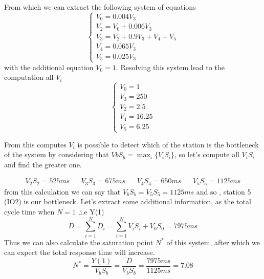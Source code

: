 \documentclass[12pt,a4paper]{article}
\begin{document}
From which we can extract the following system of equations
\begin{displaymath}
    \begin{cases}
        V_0=0.004V_3           \\
        V_2=V_0+0.006V_3       \\
        V_3=V_2+0.9V_3+V_4+V_5 \\
        V_4=0.065V_3           \\
        V_5= 0.025V_3
    \end{cases}
\end{displaymath}
with the additional equation $V_0=1$. Resolving this system lead to the computation
all $V_i$
\begin{displaymath}
    \begin{cases}
        V_0=1     \\
        V_3=250   \\
        V_2=2.5   \\
        V_4=16.25 \\
        V_5=6.25
    \end{cases}
\end{displaymath}

From this computes $V_i$ is possible to detect which of the station is the bottleneck of the system
by considering that $VbS_b= \max_i\{V_iS_i\}$, so let's compute all $V_iS_i$ and find
the greater one.

\begin{displaymath}
    \begin{aligned}
        V_2S_2= 525ms &  & V_3S_3=675ms &  & V_4S_4=650ms &  & V_5S_5= 1125ms
    \end{aligned}
\end{displaymath}
from this calculation we can say that $V_bS_b=V_5S_5=1125ms$ and so , station 5 (IO2) is
our bottleneck. Let's extract some additional information, as the total cycle time when $N=1$ ,i.e Y(1)
\begin{displaymath}
    D=\sum_{i=1}^{N}D_i=\sum_{i=1}^{N}V_iS_i + V_0S_0=7975ms
\end{displaymath}
Thus we can also calculate the saturation point $N^*$ of this system, after which we can expect
the total response time will increase.
\begin{displaymath}
    N^*=\frac{Y(1)}{V_bS_b}=\frac{D}{V_bS_b}=\frac{7975ms}{1125ms}=7.08
\end{displaymath}
\end{document}
